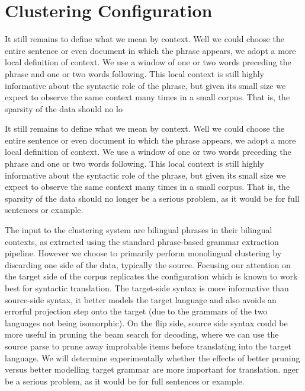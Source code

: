 \section{Clustering Configuration}

It still remains to define what we mean by context. Well we could choose the entire sentence or even document in which the phrase appears, we adopt a more local definition of context. We use a window of one or two words preceding the phrase and one or two words following. This local context is still highly informative about the syntactic role of the phrase, but given its small size we expect to observe the same context many times in a small corpus. That is, the sparsity of the data should no lo

It still remains to define what we mean by context. Well we could choose the entire sentence or even document in which the phrase appears, we adopt a more local definition of context. We use a window of one or two words preceding the phrase and one or two words following. This local context is still highly informative about the syntactic role of the phrase, but given its small size we expect to observe the same context many times in a small corpus. That is, the sparsity of the data should no longer be a serious problem, as it would be for full sentences or example.

The input to the clustering system are bilingual phrases in their bilingual contexts, as extracted using the standard phrase-based grammar extraction pipeline. However we choose to primarily perform monolingual clustering by discarding one side of the data, typically the source. Focusing our attention on the target side of the corpus replicates the configuration which is known to work best for syntactic translation. The target-side syntax is more informative than source-side syntax, it better models the target language and also avoids an errorful projection step onto the target (due to the grammars of the two languages not being isomorphic). On the flip side, source side syntax could be more useful in pruning the beam search for decoding, where we can use the source parse to prune away improbable items before translating into the target language. We will determine experimentally whether the effects of better pruning versus better modelling target grammar are more important for translation.
nger be a serious problem, as it would be for full sentences or example.

